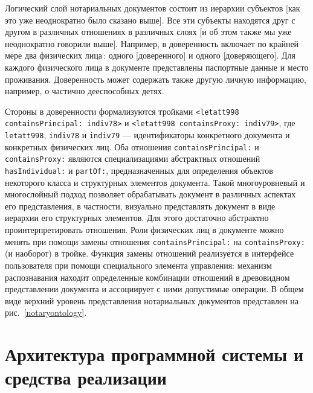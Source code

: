 \documentclass[utf8]{../IncArticle}
\newcommand{\e}[2][fcolor]{\textcolor{pcolor}{[}\textcolor{#1}{#2}\textcolor{pcolor}{]}}
\begin{document}
Логический слой нотариальных документов состоит из иерархии субъектов
\e{как это уже неоднократно было сказано выше}.  Все эти субъекты
находятся друг с другом в различных отношениях в различных слоях
\e{и об этом также мы уже неоднократно говорили выше}.  Например, в
доверенность включает по крайней мере два физических лица\,: одного
\e{доверенного} и одного \e{доверяющего}.  Для каждого физического
лица в документе представлены паспортные данные и место проживания.
Доверенность может содержать также другую личную информацию, например,
о частично дееспособных детях.

Стороны в доверенности формализуются тройками \texttt{<letatt998
  containsPrincipal: indiv78>} и \texttt{<letatt998 containsProxy:
  indiv79>}, где \texttt{letatt998}, \texttt{indiv78} и \texttt{indiv79} --- идентификаторы
конкретного документа и конкретных физических лиц.  Оба отношения
\texttt{containsPrincipal:} и  \texttt{containsProxy:} являются
специализациями абстрактных отношений \texttt{hasIndividual:} и
\texttt{partOf:}, предназначенных для определения объектов
некоторого класса и структурных элементов документа.  Такой
многоуровневый и многослойный подход позволяет обрабатывать документ в
различных аспектах его представления, в частности, визуально
представлять документ в виде иерархии его структурных элементов.  Для
этого достаточно абстрактно проинтерпретировать отношения.  Роли
физических лиц в документе можно менять при помощи замены
отношения \texttt{containsPrincipal:} на \texttt{containsProxy:} (и
наоборот) в тройке.  Функция замены отношений реализуется в интерфейсе
пользователя при помощи специального элемента управления: механизм
распознавания находит определенные комбинации отношений в древовидном
представлении документа и ассоциирует с ними допустимые операции.  В
общем виде верхний уровень представления нотариальных документов
представлен на рис.~\ref{notaryontology}.

\section{Архитектура программной системы и средства реализации}
\end{document}
